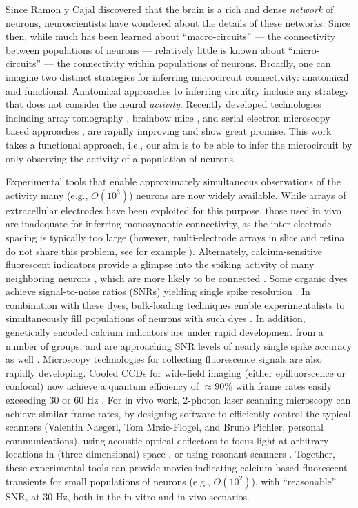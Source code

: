 Since Ramon y Cajal discovered that the brain is a rich and dense \emph{network} of neurons, neuroscientists have wondered about the details of these networks.  Since then, while much has been learned about ``macro-circuits''  --- the connectivity between populations of neurons --- relatively little is known about ``micro-circuits'' --- the connectivity within populations of neurons. Broadly, one can imagine two distinct strategies for inferring microcircuit connectivity: anatomical and functional.  Anatomical approaches to inferring circuitry include any strategy that does not consider the neural \emph{activity}.  Recently developed technologies including array tomography \cite{MichevaSmith07}, brainbow mice \cite{Brainbow07}, and serial electron microscopy based approaches \cite{Briggman2006}, are rapidly improving and show great promise.  This work takes a functional approach, i.e., our aim is to be able to infer the microcircuit by only observing the activity of a population of neurons.

Experimental tools that enable approximately simultaneous observations of the activity many (e.g., $O(10^3)$) neurons are now widely available.  While arrays of extracellular electrodes have been exploited for this purpose, those used in vivo are inadequate for inferring monosynaptic connectivity, as the inter-electrode spacing is typically too large (however, multi-electrode arrays in slice and retina do not share this problem, see for example \cite{PILL07}).  Alternately, calcium-sensitive fluorescent indicators provide a glimpse into the spiking activity of many neighboring neurons \cite{Tsien89}, which are more likely to be connected \cite{Abeles91, Braitenberg1998}. Some organic dyes achieve signal-to-noise ratios (SNRs) yielding single spike resolution \cite{ImagingManual}.  In combination with these dyes, bulk-loading techniques enable experimentalists to simultaneously fill populations of neurons with such dyes \cite{StosiekKonnerth03}.  In addition, genetically encoded calcium indicators are under rapid development from a number of groups, and are approaching SNR levels of nearly single spike accuracy as well \cite{WallaceHasan08}. Microscopy technologies for collecting fluorescence signals are also rapidly developing.  Cooled CCDs for wide-field imaging (either epifluorscence or confocal) now achieve a quantum efficiency of $\approx 90 \%$ with frame rates easily exceeding $30$ or $60$ Hz \cite{Djurisic04}.  For in vivo work, 2-photon laser scanning microscopy can achieve similar frame rates, by designing software to efficiently control the typical scanners (Valentin Naegerl, Tom Mrsic-Flogel, and Bruno Pichler, personal communications), using acoustic-optical deflectors to focus light at arbitrary locations in (three-dimensional) space \cite{ReddySaggau05, Iyer06, SalomeBourdieu06, ReddySaggau08}, or using resonant scanners \cite{NguyenParker01}.  Together, these experimental tools can provide movies indicating calcium based fluorescent transients for small populations of neurons (e.g., $O(10^2)$), with ``reasonable'' SNR, at 30 Hz, both in the in vitro and in vivo scenarios.  

